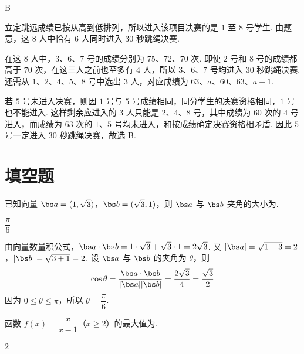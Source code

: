 \begin{answer}
B
\end{answer}

\begin{solution}
立定跳远成绩已按从高到低排列，所以进入该项目决赛的是 \(1\) 至 \(8\) 号学生. 由题意，这 \(8\) 人中恰有 \(6\) 人同时进入 \(30\) 秒跳绳决赛.

在这 \(8\) 人中，\(3\)、\(6\)、\(7\) 号的成绩分别为 \(75\)、\(72\)、\(70\) 次. 即使 \(2\) 号和 \(8\) 号的成绩都高于 \(70\) 次，在这三人之前也至多有 \(4\) 人，所以 \(3\)、\(6\)、\(7\) 号均进入 \(30\) 秒跳绳决赛. 还需从 \(1\)、\(2\)、\(4\)、\(5\)、\(8\) 号中选出 \(3\) 人，对应成绩为 \(63\)、\(a\)、\(60\)、\(63\)、\(a-1\).

若 \(5\) 号未进入决赛，则因 \(1\) 号与 \(5\) 号成绩相同，同分学生的决赛资格相同，\(1\) 号也不能进入. 这样剩余应进入的 \(3\) 人只能是 \(2\)、\(4\)、\(8\) 号，其中成绩为 \(60\) 次的 \(4\) 号进入，而成绩为 \(63\) 次的 \(1\)、\(5\) 号均未进入，和按成绩确定决赛资格相矛盾. 因此 \(5\) 号一定进入 \(30\) 秒跳绳决赛，故选 B.
\end{solution}

\section{填空题}

\begin{problem}
已知向量 \(\bs a=(1,\sqrt3)\)，\(\bs b=(\sqrt3,1)\)，则 \(\bs a\) 与 \(\bs b\) 夹角的大小为\fillinblank{}.
\end{problem}

\begin{answer}
\(\dfrac{\pi}{6}\)
\end{answer}

\begin{solution}
由向量数量积公式，\(\bs a\cdot\bs b=1\cdot\sqrt3+\sqrt3\cdot1=2\sqrt3\).
又 \(|\bs a|=\sqrt{1+3}=2\)，\(|\bs b|=\sqrt{3+1}=2\).
设 \(\bs a\) 与 \(\bs b\) 的夹角为 \(\theta\)，则
\[
\cos\theta=\frac{\bs a\cdot\bs b}{|\bs a||\bs b|}=\frac{2\sqrt3}{4}=\frac{\sqrt3}{2}
\]
因为 \(0\leq\theta\leq\pi\)，所以 \(\theta=\dfrac\pi6\).
\end{solution}

\begin{problem}
函数 \(f(x)=\dfrac{x}{x-1}\)（\(x\ge 2\)）的最大值为\fillinblank{}.
\end{problem}

\begin{answer}
\(2\)
\end{answer}

